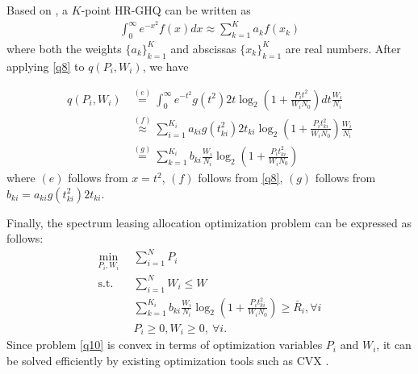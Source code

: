 \documentclass[journal]{IEEEtran}
\begin{document}
Based on \cite{NMSteen}, a $K$-point HR-GHQ can be written as
\begin{align} \label{q8}
\int_{0}^{\infty}e^{-x^2} f\left(x\right) dx \approx \sum\limits_{k = 1}^{K} a_k f\left(x_k\right)
\end{align}
where both the weights $\{a_k\}_{k = 1}^K$ and abscissas $\{x_k\}_{k = 1}^K$ are real numbers. After applying \eqref{q8} to $q\left(P_i, W_i\right)$, we have

\begin{align}
q\left(P_i, W_i\right) &\overset{\left(e\right)}{=} \int_{0}^{\infty}e^{-t^2} g\left(t^2\right) 2t \log_2\left(1 + \frac{P_it^2}{W_iN_0}\right)dt \frac{W_i}{N_i} \nonumber \\
& \overset{\left(f\right)}{\approx} \sum\limits_{i = 1}^{K_i}a_{ki}g\left(t_{ki}^2\right)2t_{ki}\log_2\left(1 + \frac{P_it_{ki}^2}{W_iN_0}\right)\frac{W_i}{N_i} \nonumber \\
& \overset{\left(g\right)}{=} \sum\limits_{k = 1}^{K_i}b_{ki}\frac{W_i}{N_i}\log_2\left(1 + \frac{P_it_{ki}^2}{W_iN_0}\right)
\end{align}
where $\left(e\right)$ follows from $x = t^2$, $\left(f\right)$ follows from \eqref{q8}, $\left(g\right)$ follows from $b_{ki} = a_{ki}g\left(t_{ki}^2\right)2t_{ki}$.

Finally, the spectrum leasing allocation optimization problem can be expressed as follows:
\begin{subequations}\label{q10}
	\begin{align}
	\min_{P_i, W_i}\ & \sum\limits_{i = 1}^{N} P_i \label{q10a} \\ \mbox{s.t.} \quad &  \sum\limits_{i = 1}^{N} W_i \leq W \label{q10b} \\ \quad &  \sum\limits_{k = 1}^{K_i}b_{ki}\frac{W_i}{N_i}\log_2\left(1 + \frac{P_it_{ki}^2}{W_iN_0}\right) \geq \bar{R}_i, \forall i \label{q10c}\\
	& P_i \geq 0, W_i \geq 0, \ \forall i. \label{q10d}
	\end{align}
\end{subequations}
Since problem \eqref{q10} is convex in terms of optimization variables $P_i$ and $W_i$, it can be solved efficiently by existing optimization tools such as CVX \cite{SBoyd1}.
\end{document}
